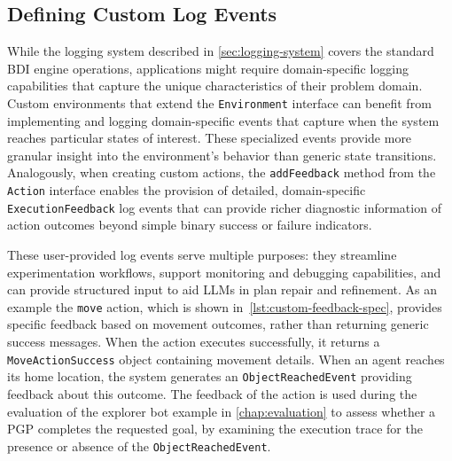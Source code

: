 \documentclass[12pt,a4paper,openright,twoside]{book}
\begin{document}


\subsection{Defining Custom Log Events}\label{sec:custom-log-events}

While the logging system described in \cref{sec:logging-system} covers the standard BDI engine operations, applications might require domain-specific logging capabilities that capture the unique characteristics of their problem domain.
%
Custom environments that extend the \texttt{Environment} interface can benefit from implementing and logging domain-specific events that capture when the system reaches particular states of interest. 
%
These specialized events provide more granular insight into the environment's behavior than generic state transitions.
%
Analogously, when creating custom actions, the \texttt{addFeedback} method from the \texttt{Action} interface enables the provision of detailed, domain-specific \texttt{ExecutionFeedback} log events that can provide richer diagnostic information of action outcomes beyond simple binary success or failure indicators.



These user-provided log events serve multiple purposes: they streamline experimentation workflows, support monitoring and debugging capabilities, and can provide structured input to aid \acp{LLM} in plan repair and refinement.
%
As an example the \texttt{move} action, which is shown in~\cref{lst:custom-feedback-spec}, provides specific feedback based on movement outcomes, rather than returning generic success messages. 
%
When the action executes successfully, it returns a \texttt{MoveActionSuccess} object containing movement details. When an agent reaches its home location, the system generates an \texttt{ObjectReachedEvent} providing feedback about this outcome.
%
The feedback of the action is used during the evaluation of the explorer bot example in \cref{chap:evaluation} to assess whether a \ac{PGP} completes the requested goal, by examining the execution trace for the presence or absence of the \texttt{ObjectReachedEvent}.
\end{document}
